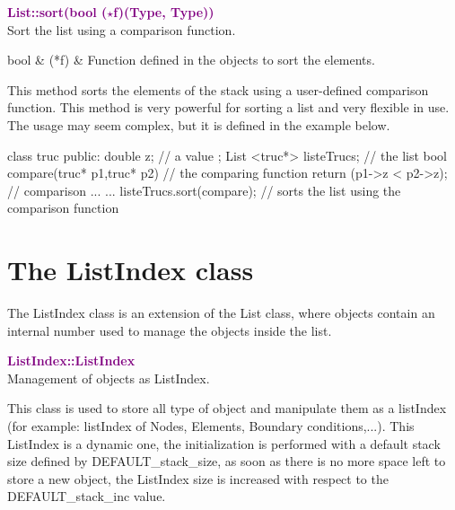 \textcolor{purple}{\textbf{List::sort(bool ($\star$f)(Type, Type))}}\label{List::sort(bool (*f)(Type, Type))}\\
Sort the list using a comparison function.

\begin{tcolorbox}[width=\textwidth,myArgs,tabularx={ll|R}]
bool & (*f) & Function defined in the objects to sort the elements.
\end{tcolorbox}

This method sorts the elements of the stack using a user-defined comparison function.
This method is very powerful for sorting a list and very flexible in use.
The usage may seem complex, but it is defined in the example below.
\begin{CppListing}
class truc
{
  public:
  double z; // a value
};
List <truc*> listeTrucs; // the list
bool compare(truc* p1,truc* p2) // the comparing function
{
  return (p1->z < p2->z); // comparison
}
...
{
...
listeTrucs.sort(compare); // sorts the list using the comparison function
}
\end{CppListing}

\section{The ListIndex class}

The ListIndex class is an extension of the List class, where objects contain an internal number used to manage the objects inside the list.

\textcolor{purple}{\textbf{ListIndex::ListIndex}}\label{ListIndex::ListIndex}\\
Management of objects as ListIndex.

This class is used to store all type of object and manipulate them as a listIndex (for example: listIndex of Nodes, Elements, Boundary conditions,...).
This ListIndex is a dynamic one, the initialization is performed with a default stack size defined by DEFAULT\_stack\_size, as soon as there is no more space left to store a new object,
the ListIndex size is increased with respect to the DEFAULT\_stack\_inc value.




